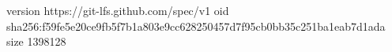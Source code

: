 version https://git-lfs.github.com/spec/v1
oid sha256:f59fe5e20ce9fb5f7b1a803e9cc628250457d7f95cb0bb35c251ba1eab7d1ada
size 1398128
